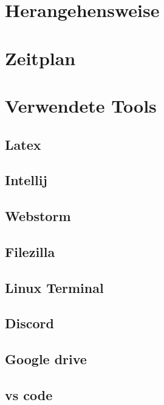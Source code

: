 \section{Herangehensweise}


\section{Zeitplan}


\section{Verwendete Tools}


\subsection{Latex}
\subsection{Intellij}
\subsection{Webstorm}
\subsection{Filezilla}
\subsection{Linux Terminal}
\subsection{Discord}
\subsection{Google drive}
\subsection{vs code}
